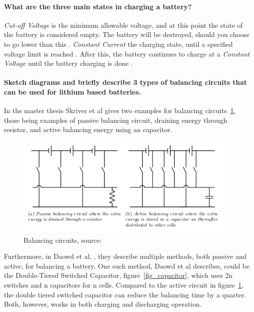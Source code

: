 \documentclass[paper=letter, fontsize=10pt]{article}
\begin{document}
\paragraph{What are the three main states in charging a battery?}
\emph{Cut-off Voltage} is the minimum allowable voltage, and at this point the state of the battery is considered empty. The battery will be destroyed, should you choose to go lower than this \cite{understand_battery}.
\emph{Constant Current} the charging state, until a specified voltage limit is reached \cite{master_thesis}. After this, the battery continues to charge at a \emph{Constant Voltage} until the battery charging is done \cite{master_thesis}.


\paragraph{Sketch diagrams and briefly describe 3 types of balancing circuits that can be used for lithium based batteries.}
In the master thesis Skriver et al \cite{master_thesis} gives two examples for balancing circuits~\ref{fig_circuits}, those being examples of passive balancing circuit, draining energy through resistor, and active balancing energy using an capacitor.
\begin{figure}
\centering
\includegraphics[scale=0.8]{Figures/balancecircuit}
\caption{Balancing circuits, source: \cite{master_thesis}}
\label{fig_circuits}
\end{figure}

Furthermore, in Daowd et al, \cite{balancing}, they describe multiple methods, both passive and active, for balancing a battery. 
One such method, Daowd et al describes, could be the Double-Tiered Switched Capacitor, figure~\ref{fig_capacitor}, which uses 2n switches and n capacitors for n cells. Compared to the active circuit in figure~\ref{fig_circuits}, the double tiered switched capacitor can reduce the balancing time by a quarter. Both, however, works in both charging and discharging operation.
\end{document}
